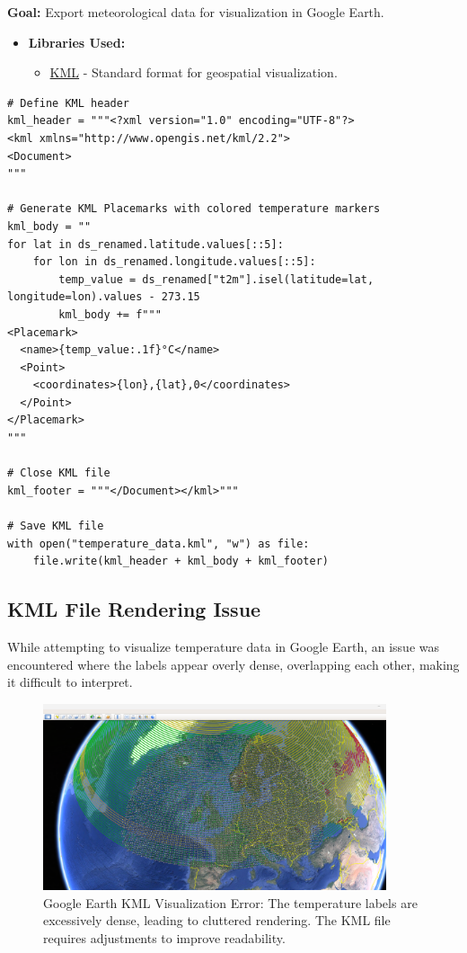 \documentclass[a4paper,10pt]{article}
\begin{document}
\textbf{Goal:} Export meteorological data for visualization in Google Earth.

\begin{itemize}
    \item \textbf{Libraries Used:}
    \begin{itemize}
        \item \href{https://developers.google.com/kml/documentation/}{KML} - Standard format for geospatial visualization.
    \end{itemize}
\end{itemize}

\begin{verbatim}
# Define KML header
kml_header = """<?xml version="1.0" encoding="UTF-8"?>
<kml xmlns="http://www.opengis.net/kml/2.2">
<Document>
"""

# Generate KML Placemarks with colored temperature markers
kml_body = ""
for lat in ds_renamed.latitude.values[::5]:  
    for lon in ds_renamed.longitude.values[::5]:
        temp_value = ds_renamed["t2m"].isel(latitude=lat, longitude=lon).values - 273.15
        kml_body += f"""
<Placemark>
  <name>{temp_value:.1f}°C</name>
  <Point>
    <coordinates>{lon},{lat},0</coordinates>
  </Point>
</Placemark>
"""

# Close KML file
kml_footer = """</Document></kml>"""

# Save KML file
with open("temperature_data.kml", "w") as file:
    file.write(kml_header + kml_body + kml_footer)
\end{verbatim}

\newpage
\subsection{KML File Rendering Issue}

While attempting to visualize temperature data in Google Earth, an issue was encountered where the labels appear overly dense, overlapping each other, making it difficult to interpret.

\begin{figure}[H]
    \centering
    \includegraphics[width=0.9\textwidth]{gge_image_error.png}
    \caption{Google Earth KML Visualization Error: The temperature labels are excessively dense, leading to cluttered rendering. The KML file requires adjustments to improve readability.}
    \label{fig:kml_error}
\end{figure}
\end{document}
